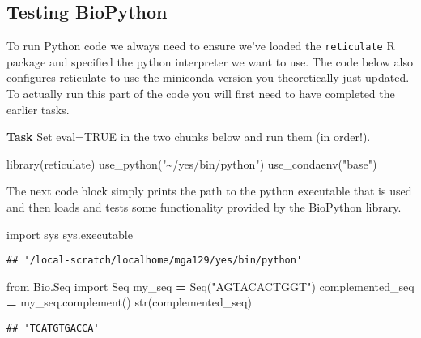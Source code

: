 \documentclass[
]{article}
\newenvironment{Shaded}{\begin{snugshade}}{\end{snugshade}}
\newcommand{\BuiltInTok}[1]{#1}
\newcommand{\FunctionTok}[1]{\textcolor[rgb]{0.00,0.00,0.00}{#1}}
\newcommand{\ImportTok}[1]{#1}
\newcommand{\NormalTok}[1]{#1}
\newcommand{\OperatorTok}[1]{\textcolor[rgb]{0.81,0.36,0.00}{\textbf{#1}}}
\newcommand{\StringTok}[1]{\textcolor[rgb]{0.31,0.60,0.02}{#1}}
\begin{document}
\hypertarget{testing-biopython}{%
\subsection{Testing BioPython}\label{testing-biopython}}

To run Python code we always need to ensure we've loaded the
\texttt{reticulate} R package and specified the python interpreter we
want to use. The code below also configures reticulate to use the
miniconda version you theoretically just updated. To actually run this
part of the code you will first need to have completed the earlier
tasks.

\textbf{Task} Set eval=TRUE in the two chunks below and run them (in
order!).

\begin{Shaded}
\begin{Highlighting}[]
\FunctionTok{library}\NormalTok{(reticulate)}
\FunctionTok{use\_python}\NormalTok{(}\StringTok{"\textasciitilde{}/yes/bin/python"}\NormalTok{)}
\FunctionTok{use\_condaenv}\NormalTok{(}\StringTok{"base"}\NormalTok{)}
\end{Highlighting}
\end{Shaded}

The next code block simply prints the path to the python executable that
is used and then loads and tests some functionality provided by the
BioPython library.

\begin{Shaded}
\begin{Highlighting}[]
\ImportTok{import}\NormalTok{ sys}
\NormalTok{sys.executable}
\end{Highlighting}
\end{Shaded}

\begin{verbatim}
## '/local-scratch/localhome/mga129/yes/bin/python'
\end{verbatim}

\begin{Shaded}
\begin{Highlighting}[]
\ImportTok{from}\NormalTok{ Bio.Seq }\ImportTok{import}\NormalTok{ Seq}
\NormalTok{my\_seq }\OperatorTok{=}\NormalTok{ Seq(}\StringTok{"AGTACACTGGT"}\NormalTok{)}
\NormalTok{complemented\_seq }\OperatorTok{=}\NormalTok{ my\_seq.complement()}
\BuiltInTok{str}\NormalTok{(complemented\_seq)}
\end{Highlighting}
\end{Shaded}

\begin{verbatim}
## 'TCATGTGACCA'
\end{verbatim}
\end{document}
